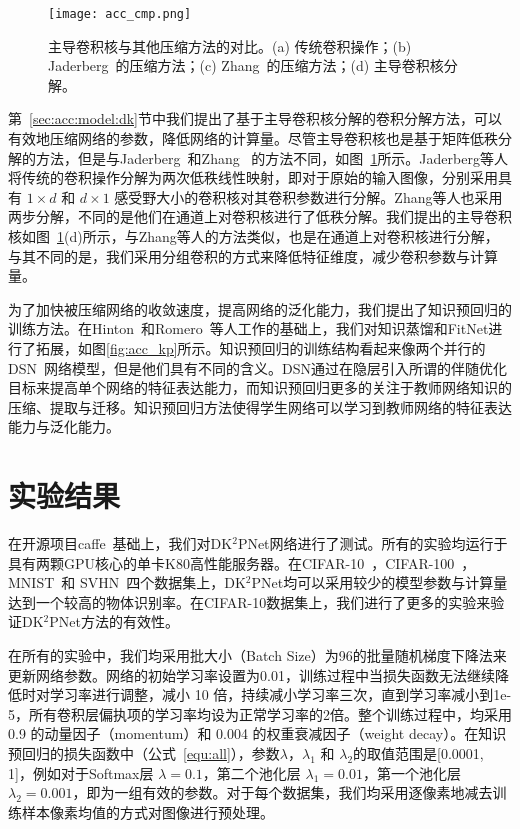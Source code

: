 \begin{figure}
\begin{center}
\centerline{\texttt{[image: acc\_cmp.png]}}
\caption{主导卷积核与其他压缩方法的对比。(a) 传统卷积操作；(b) Jaderberg~\cite{jaderberg2014speeding}的压缩方法；(c) Zhang~\cite{zhang2015efficient}的压缩方法；(d) 主导卷积核分解。}
\label{fig:acc_cmp}
\end{center}
\end{figure} 

第~\ref{sec:acc:model:dk}节中我们提出了基于主导卷积核分解的卷积分解方法，可以有效地压缩网络的参数，降低网络的计算量。尽管主导卷积核也是基于矩阵低秩分解的方法，但是与Jaderberg~\cite{jaderberg2014speeding}和Zhang~\cite{zhang2015efficient} 的方法不同，如图~\ref{fig:acc_cmp}所示。Jaderberg等人将传统的卷积操作分解为两次低秩线性映射，即对于原始的输入图像，分别采用具有 $1{\times}d$ 和 $d{\times}1$ 感受野大小的卷积核对其卷积参数进行分解。Zhang等人也采用两步分解，不同的是他们在通道上对卷积核进行了低秩分解。我们提出的主导卷积核如图~\ref{fig:acc_cmp}(d)所示，与Zhang等人的方法类似，也是在通道上对卷积核进行分解，与其不同的是，我们采用分组卷积的方式来降低特征维度，减少卷积参数与计算量。

为了加快被压缩网络的收敛速度，提高网络的泛化能力，我们提出了知识预回归的训练方法。在Hinton~\cite{hinton2015distilling}和Romero~\cite{romero2014fitnets}等人工作的基础上，我们对知识蒸馏和FitNet进行了拓展，如图\ref{fig:acc_kp}所示。知识预回归的训练结构看起来像两个并行的DSN~\cite{lee2015deeply}网络模型，但是他们具有不同的含义。DSN通过在隐层引入所谓的伴随优化目标来提高单个网络的特征表达能力，而知识预回归更多的关注于教师网络知识的压缩、提取与迁移。知识预回归方法使得学生网络可以学习到教师网络的特征表达能力与泛化能力。

\section{实验结果}
\label{sec:acc:experiment}

在开源项目caffe~\cite{jia2014caffe}基础上，我们对DK$^2$PNet网络进行了测试。所有的实验均运行于具有两颗GPU核心的单卡K80高性能服务器。在CIFAR-10~\cite{krizhevsky2009learning}，CIFAR-100~\cite{krizhevsky2009learning}，MNIST~\cite{lecun1998gradient}和 SVHN~\cite{netzer2011reading}四个数据集上，DK$^2$PNet均可以采用较少的模型参数与计算量达到一个较高的物体识别率。在CIFAR-10数据集上，我们进行了更多的实验来验证DK$^2$PNet方法的有效性。

在所有的实验中，我们均采用批大小（Batch Size）为96的批量随机梯度下降法来更新网络参数。网络的初始学习率设置为0.01，训练过程中当损失函数无法继续降低时对学习率进行调整，减小 10 倍，持续减小学习率三次，直到学习率减小到1e-5，所有卷积层偏执项的学习率均设为正常学习率的2倍。整个训练过程中，均采用 0.9 的动量因子（momentum）和 0.004 的权重衰减因子（weight decay）。在知识预回归的损失函数中（公式~\ref{equ:all}），参数$\lambda$，${\lambda}_1$ 和 ${\lambda}_2$的取值范围是[0.0001, 1]，例如对于Softmax层 $\lambda=0.1$，第二个池化层 ${\lambda}_1=0.01$，第一个池化层 ${\lambda}_2=0.001$，即为一组有效的参数。对于每个数据集，我们均采用逐像素地减去训练样本像素均值的方式对图像进行预处理。

